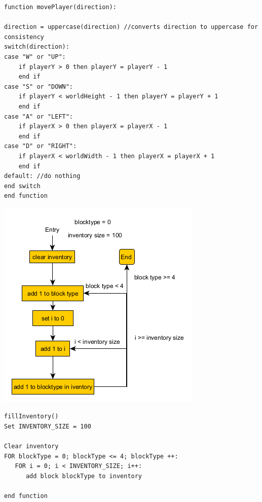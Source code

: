 \begin{lstlisting}
function movePlayer(direction):

direction = uppercase(direction) //converts direction to uppercase for consistency
switch(direction):
case "W" or "UP":
	if playerY > 0 then playerY = playerY - 1
	end if
case "S" or "DOWN":
	if playerY < worldHeight - 1 then playerY = playerY + 1
	end if
case "A" or "LEFT":
	if playerX > 0 then playerX = playerX - 1
	end if
case "D" or "RIGHT":
	if playerX < worldWidth - 1 then playerX = playerX + 1
	end if
default: //do nothing
end switch
end function
\end{lstlisting}
\newpage

{\includegraphics[width=\textwidth]{../flowchart/fillInventory.png}}
\begin{lstlisting}
fillInventory()
Set INVENTORY_SIZE = 100

Clear inventory
FOR blockType = 0; blockType <= 4; blockType ++:
   FOR i = 0; i < INVENTORY_SIZE; i++:
      add block blockType to inventory
      
end function
\end{lstlisting}
\newpage
